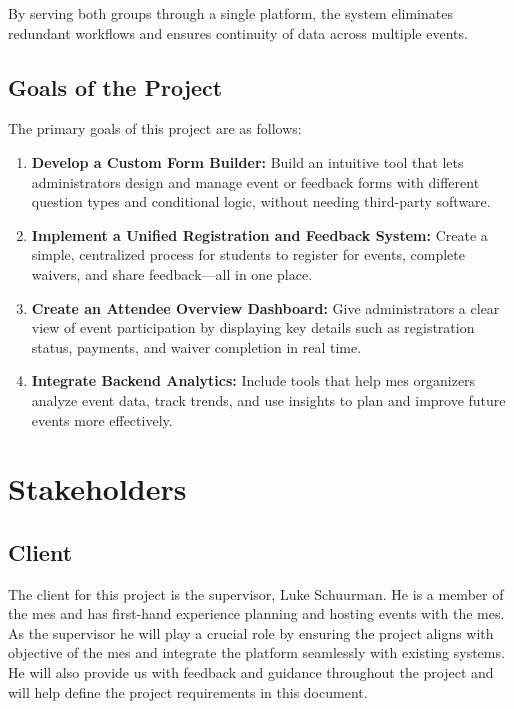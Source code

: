 \documentclass[12pt]{article}
\newcommand{\lips}{\textit{Insert your content here.}}
\begin{document}
By serving both groups through a single platform, the system eliminates redundant workflows and ensures continuity of
data across multiple events.

\subsection{Goals of the Project}

The primary goals of this project are as follows:

\begin{enumerate}
    \item \textbf{Develop a Custom Form Builder:} Build an intuitive tool that lets administrators design and manage
      event or feedback forms with different question types and conditional logic, without needing third-party software.
    \item \textbf{Implement a Unified Registration and Feedback System:} Create a simple, centralized process for
      students to register for events, complete waivers, and share feedback—all in one place.
    \item \textbf{Create an Attendee Overview Dashboard:} Give administrators a clear view of event participation by
      displaying key details such as registration status, payments, and waiver completion in real time.
    \item \textbf{Integrate Backend Analytics:} Include tools that help \gls{mes} organizers analyze event data, track
      trends, and use insights to plan and improve future events more effectively.
\end{enumerate}



\section{Stakeholders}
\subsection{Client}
The client for this project is the supervisor, Luke Schuurman. He is a member of the \gls{mes} and has first-hand
experience planning and hosting events with the \gls{mes}. As the supervisor he will play a crucial role by ensuring the
project aligns with objective of the \gls{mes} and integrate the platform seamlessly with existing systems. He will also
provide us with feedback and guidance throughout the project and will help define the project requirements in this
document.
\end{document}
